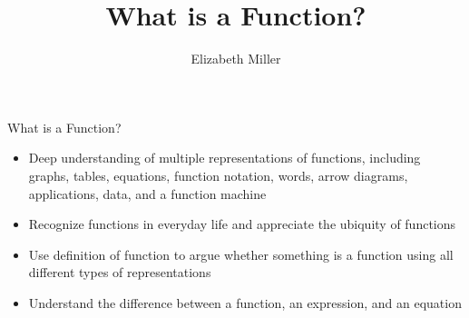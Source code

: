 \documentclass{ximera}
\author{Elizabeth Miller}
\title{What is a Function?}
\begin{document}
\begin{abstract}
\end{abstract}
\maketitle


\begin{objectives}

\item What is a Function?
\begin{itemize}
	\item Deep understanding of multiple representations of functions, including graphs, tables, equations, function notation, words, arrow diagrams, applications, data, and a function machine 
	\item Recognize functions in everyday life and appreciate the ubiquity of functions 
	\item Use definition of function to argue whether something is a function using all different types of representations
	\item Understand the difference between a function, an expression, and an equation
\end{itemize}




\end{objectives}
\end{document}
